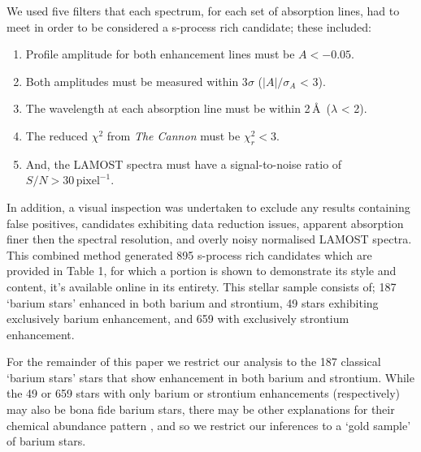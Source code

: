 \documentclass[a4paper,fleqn,usenatbib]{mnras}
\begin{document}
We used five filters that each spectrum, for each set of absorption lines, had to meet in order to be considered a s-process rich candidate; these included:


\renewcommand\labelenumi{(\roman{enumi})}
\renewcommand\theenumi\labelenumi

\begin{enumerate} 
\item Profile amplitude for both enhancement lines must be $A < -0.05$.
\item Both amplitudes must be measured within 3$\sigma$ ($|A|/\sigma _A$ < 3).
\item The wavelength at each absorption line must be within 2\,\AA\ ($\lambda$ < 2).
\item The reduced $\chi^2$ from \emph{The Cannon} must be $\chi_r^2 < 3$.
\item And, the LAMOST spectra must have a signal-to-noise ratio of $S/N > 30\,\textrm{pixel}^{-1}$.
\end{enumerate}
In addition, a visual inspection was undertaken to exclude any results containing false positives, candidates exhibiting data reduction issues, apparent absorption finer then the spectral resolution, and overly noisy normalised LAMOST spectra. This combined method generated 895 s-process rich candidates which are provided in Table 1, for which a portion is shown to demonstrate its style and content, it's available online in its entirety. This stellar sample consists of; 187 `barium stars' enhanced in both barium and strontium, 49 stars exhibiting exclusively barium enhancement, and 659 with exclusively strontium enhancement. 

For the remainder of this paper we restrict our analysis to the 187 classical `barium stars' stars that show enhancement in both barium and strontium. While the 49 or 659 stars with only barium or strontium enhancements (respectively) may also be bona fide barium stars, there may be other explanations for their chemical abundance pattern \citep[e.g.,][]{maiorca2011}, and so we restrict our inferences to a `gold sample' of barium stars. 
\end{document}
